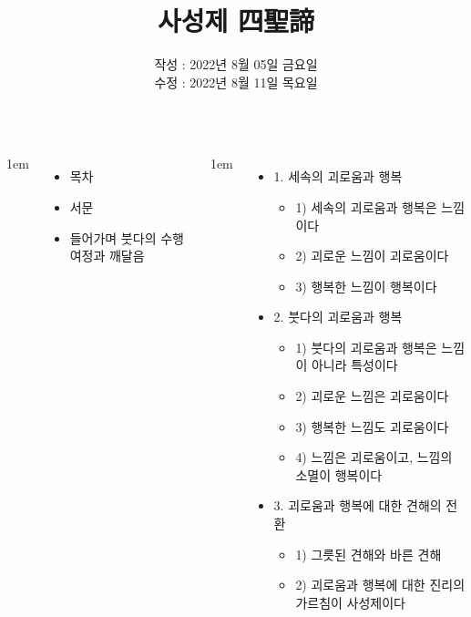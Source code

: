 \documentclass[	14pt, 
							a1paper, 
							portrait, %
							margin=0mm, %
							innermargin=10mm,  		%
							colspace=5mm, 
							subcolspace=0mm
							]{tikzposter}
\title{사성제 四聖諦}
\author{ 	작성 : 2022년 8월 05일 금요일 \\
				수정 : 2022년 8월 11일 목요일  }
\begin{document}
	\maketitle

	\begin{columns}


			{
					\setlength{\leftmargini}{2em}
					\setlength{\labelsep} {1em}
					\begin{itemize}
					\item 목차
					\item 서문
					\item 들어가며  붓다의 수행 여정과 깨달음
					\end{itemize}
			}

			{
					\setlength{\leftmargini}{2em}
					\setlength{\labelsep} {1em}
					\begin{itemize}
					\item 1. 세속의 괴로움과 행복
						\begin{itemize}
						\item 1) 세속의 괴로움과 행복은 느낌이다
						\item 2) 괴로운 느낌이 괴로움이다
						\item 3) 행복한 느낌이 행복이다
						\end{itemize}

					\item 2. 붓다의 괴로움과 행복
						\begin{itemize}
						\item 1) 붓다의 괴로움과 행복은 느낌이 아니라 특성이다
						\item 2) 괴로운 느낌은 괴로움이다
						\item 3) 행복한 느낌도 괴로움이다
						\item 4) 느낌은 괴로움이고, 느낌의 소멸이 행복이다
						\end{itemize}

					\item 3. 괴로움과 행복에 대한 견해의 전환
						\begin{itemize}
						\item 1) 그릇된 견해와 바른 견해
						\item 2) 괴로움과 행복에 대한 진리의 가르침이 사성제이다
						\end{itemize}


\end{itemize}}
\end{columns}
\end{document}

